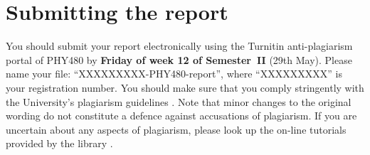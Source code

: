 \documentclass[a4paper,fleqn,usenatbib]{mnras}
\begin{document}
\section{Submitting the report}


You should submit your report electronically using the Turnitin anti-plagiarism portal of PHY480 by \textbf{Friday of week 12 of Semester~II} (29th May). Please name your file: ``XXXXXXXXX-PHY480-report'', where ``XXXXXXXXX'' is your registration number. You should make sure that you comply stringently with the University's plagiarism guidelines \citep{plagiarism}. Note that minor changes to the original wording do not constitute a defence against accusations of plagiarism. If you are uncertain about any aspects of  plagiarism, please look up the on-line tutorials provided by the library \citep{Referencing}. 









%

%


\end{document}

